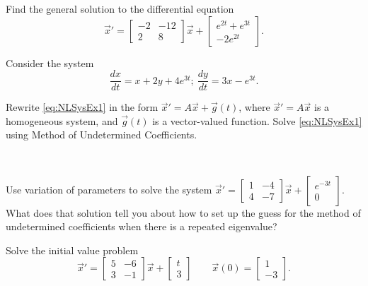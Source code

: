 \begin{exercise}
Find the general solution to the differential equation
\begin{equation*}
{\vec{x}}' = \begin{bmatrix} -2 & -12 \\ 2 & 8 \end{bmatrix} \vec{x} + \begin{bmatrix} e^{2t} + e^{3t} \\ -2e^{2t} \end{bmatrix}. 
\end{equation*}
\end{exercise}

\begin{exercise}
Consider the system %
\begin{equation}
\frac{dx}{dt}= x+2y+4e^{3t};\ \frac{dy}{dt}=3x-e^{3t}. \label{eq:NLSysEx1}
\end{equation}

\begin{tasks}
\task Rewrite \eqref{eq:NLSysEx1} in the form $\vec{x}'=A\vec{x}+\vec{g}(t)$, where $\vec{x}'=A\vec{x}$ is a homogeneous system, and $\vec{g}(t)$ is a vector-valued function.
\task Solve \eqref{eq:NLSysEx1} using Method of Undetermined Coefficients.
\end{tasks}
\end{exercise}

\begin{exercise}
\ 
\begin{tasks} 
\task Use variation of parameters to solve the system $\vec{x}'=\begin{bmatrix}1&-4\\ 4&-7\end{bmatrix}\vec{x}+\displaystyle \begin{bmatrix} e^{-3t} \\ 0 \end{bmatrix}$.
\task What does that solution tell you about how to set up the guess for the method of undetermined coefficients when there is a repeated eigenvalue?
\end{tasks}
\end{exercise}

\begin{exercise}
Solve the initial value problem
\[ {\vec{x}}' = \begin{bmatrix} 5 & -6 \\ 3 & -1 \end{bmatrix}\vec{x} + \begin{bmatrix} t \\ 3 \end{bmatrix} \qquad \vec{x}(0) = \begin{bmatrix} 1 \\ -3 \end{bmatrix}. \]
\end{exercise}

